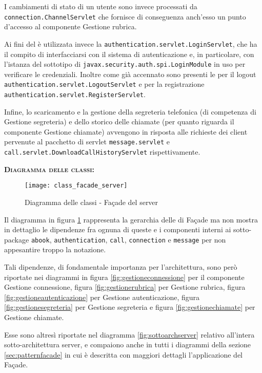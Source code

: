 \begin{description}
I cambiamenti di stato di un utente sono invece processati da \texttt{connection.ChannelServlet} che fornisce di conseguenza anch'esso un punto d'accesso al componente \textsf{Gestione rubrica}.

Ai fini del  è utilizzata invece la  \texttt{authentication.servlet.LoginServlet}, che ha il compito di interfacciarsi con il sistema di autenticazione e, in particolare, con l'istanza del sottotipo di \texttt{javax.security.auth.spi.LoginModule} in uso per verificare le credenziali. Inoltre come già accennato sono presenti le  per il logout \texttt{authentication.servlet.LogoutServlet} e per la registrazione \texttt{authentication.servlet.RegisterServlet}.

Infine, lo scaricamento e la gestione della segreteria telefonica (di competenza di \textsf{Gestione segreteria}) e dello storico delle chiamate (per quanto riguarda il componente \textsf{Gestione chiamate}) avvengono in risposta alle richieste dei client pervenute al pacchetto di servlet \texttt{message.servlet} e \texttt{call.servlet.DownloadCallHistoryServlet} rispettivamente. 

	\item{\scshape\bfseries Diagramma delle classi:}
\begin{figure}[H]
  \centering
  \texttt{[image: class\_facade\_server]}
  \caption{Diagramma delle classi - Façade del server}\label{fig:facadeserver}
\end{figure}

Il diagramma in figura \ref{fig:facadeserver} rappresenta la gerarchia delle  di Façade ma non mostra in dettaglio le dipendenze fra ognuna di queste e i componenti interni ai sotto-package \texttt{abook}, \texttt{authentication}, \texttt{call}, \texttt{connection} e \texttt{message} per non appesantire troppo la notazione.

Tali dipendenze, di fondamentale importanza per l'architettura, sono però riportate nei diagrammi in figura \vref{fig:gestioneconnessione} per il componente \textsf{Gestione connessione}, figura \vref{fig:gestionerubrica} per \textsf{Gestione rubrica}, figura \vref{fig:gestioneautenticazione} per \textsf{Gestione autenticazione}, figura \vref{fig:gestionesegreteria} per \textsf{Gestione segreteria} e figura \vref{fig:gestionechiamate} per \textsf{Gestione chiamate}.

Esse sono altresì riportate nel diagramma \vref{fig:sottoarchserver} relativo all'intera sotto-architettura server, e compaiono anche in tutti i diagrammi della sezione \vref{sec:patternfacade} in cui è descritta con maggiori dettagli l'applicazione del  Façade.
	

\end{description}

